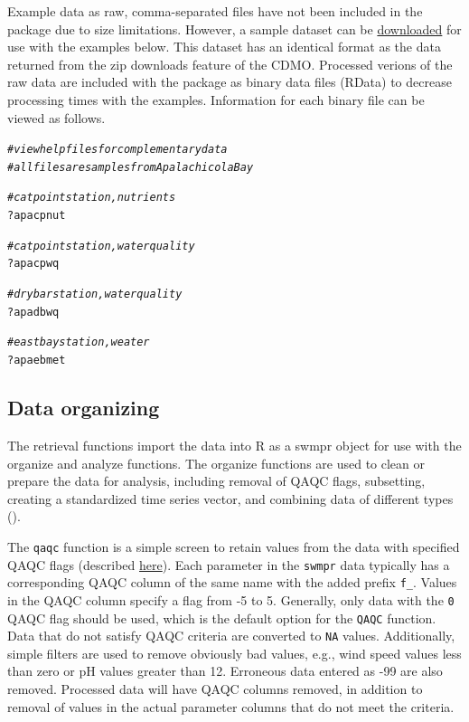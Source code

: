\documentclass[10pt,letterpaper]{article}\usepackage[]{graphicx}\usepackage[]{color}
\makeatletter
\newcommand{\hlcom}[1]{\textcolor[rgb]{0.678,0.584,0.686}{\textit{#1}}}%
\newcommand{\hlopt}[1]{\textcolor[rgb]{0,0,0}{#1}}%
\newcommand{\hlstd}[1]{\textcolor[rgb]{0.345,0.345,0.345}{#1}}%
\newenvironment{kframe}{%
 \def\at@end@of@kframe{}%
 \ifinner\ifhmode%
  \def\at@end@of@kframe{\end{minipage}}%
  \begin{minipage}{\columnwidth}%
 \fi\fi%
 \def\FrameCommand##1{\hskip\@totalleftmargin \hskip-\fboxsep
 \colorbox{shadecolor}{##1}\hskip-\fboxsep
     \hskip-\linewidth \hskip-\@totalleftmargin \hskip\columnwidth}%
 \MakeFramed {\advance\hsize-\width
   \@totalleftmargin\z@ \linewidth\hsize
   \@setminipage}}%
 {\par\unskip\endMakeFramed%
 \at@end@of@kframe}
\newenvironment{knitrout}{}{} %
\makeatother
\begin{document}
Example data as raw, comma-separated files have not been included in the package due to size limitations.  However, a sample dataset can be \href{https://s3.amazonaws.com/swmpexdata/zip_ex.zip}{downloaded} for use with the examples below.  This dataset has an identical format as the data returned from the zip downloads feature of the \ac{CDMO}.  Processed verions of the raw data are included with the package as binary data files (RData) to decrease processing times with the examples.  Information for each binary file can be viewed as follows.

\begin{knitrout}
\color{fgcolor}\begin{kframe}
\begin{alltt}
\hlcom{# view help files for complementary data}
\hlcom{# all files are samples from Apalachicola Bay}

\hlcom{# cat point station, nutrients}
\hlopt{?}\hlstd{apacpnut}

\hlcom{# cat point station, water quality}
\hlopt{?}\hlstd{apacpwq}

\hlcom{# dry bar station, water quality}
\hlopt{?}\hlstd{apadbwq}

\hlcom{# east bay station, weater}
\hlopt{?}\hlstd{apaebmet}
\end{alltt}
\end{kframe}
\end{knitrout}

\subsection*{Data organizing}

The retrieval functions import the data into R as a swmpr object for use with the organize and analyze functions. The organize functions are used to clean or prepare the data for analysis, including removal of QAQC flags, subsetting, creating a standardized time series vector, and combining data of different types ().

The \texttt{qaqc} function is a simple screen to retain values from the data with specified QAQC flags (described \href{http://cdmo.baruch.sc.edu/data/qaqc.cfm}{here}).  Each parameter in the \texttt{swmpr} data typically has a corresponding QAQC column of the same name with the added prefix \texttt{f\_}.  Values in the QAQC column specify a flag from -5 to 5.  Generally, only data with the  \texttt{0} \ac{QAQC} flag should be used, which is the default option for the \texttt{QAQC} function.  Data that do not satisfy \ac{QAQC} criteria are converted to \texttt{NA} values.   Additionally, simple filters are used to remove obviously bad values, e.g., wind speed values less than zero or pH values greater than 12. Erroneous data entered as -99 are also removed. Processed data will have QAQC columns removed, in addition to removal of values in the actual parameter columns that do not meet the criteria. 
\end{document}
